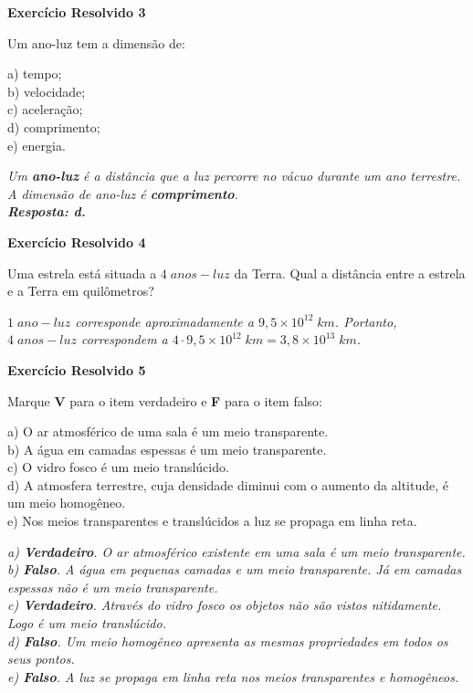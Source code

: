 \documentclass[11pt,twocolumn,oneside]{article}
\newenvironment{resposta*}
  {\bf Resposta:\\ }
  {}
\begin{document}
\textbf{Exercício Resolvido 3}


Um ano-luz tem a dimensão de:


a) tempo; \\
b) velocidade; \\
c) aceleração; \\
d) comprimento; \\
e) energia.


\begin{resposta*}
{\it Um \textbf{ano-luz} é a distância que a luz percorre no vácuo durante um ano terrestre. A dimensão de ano-luz é \textbf{comprimento}. \\
\textbf{Resposta: d.}}
\end{resposta*}

\textbf{Exercício Resolvido 4}


Uma estrela está situada a $4\;anos-luz$ da Terra. Qual a distância entre a estrela e a Terra em quilômetros?


\begin{resposta*}
{\it $1\;ano-luz$ corresponde aproximadamente a $9,5\times 10^{12}\;km$. Portanto, $4\;anos-luz$ correspondem a $4\cdot 9,5\times 10^{12}\;km = 3,8\times 10^{13}\;km$.}
\end{resposta*}

\textbf{Exercício Resolvido 5}


Marque \textbf{V} para o item verdadeiro e \textbf{F} para o item falso:


a) O ar atmosférico de uma sala é um meio transparente. \\
b) A água em camadas espessas é um meio transparente. \\
c) O vidro fosco é um meio translúcido. \\
d) A atmosfera terrestre, cuja densidade diminui com o aumento da altitude, é um meio homogêneo. \\
e) Nos meios transparentes e translúcidos a luz se propaga em linha reta.


\begin{resposta*}
{\it a) \textbf{Verdadeiro}. O ar atmosférico existente em uma sala é um meio transparente. \\
b) \textbf{Falso}. A água em pequenas camadas e um meio transparente. Já em camadas espessas não é um meio transparente. \\
c) \textbf{Verdadeiro}. Através do vidro fosco os objetos não são vistos nitidamente. Logo é um meio translúcido. \\
d) \textbf{Falso}. Um meio homogêneo apresenta as mesmas propriedades em todos os seus pontos. \\
e) \textbf{Falso}. A luz se propaga em linha reta nos meios transparentes e homogêneos.}
\end{resposta*}
\end{document}
